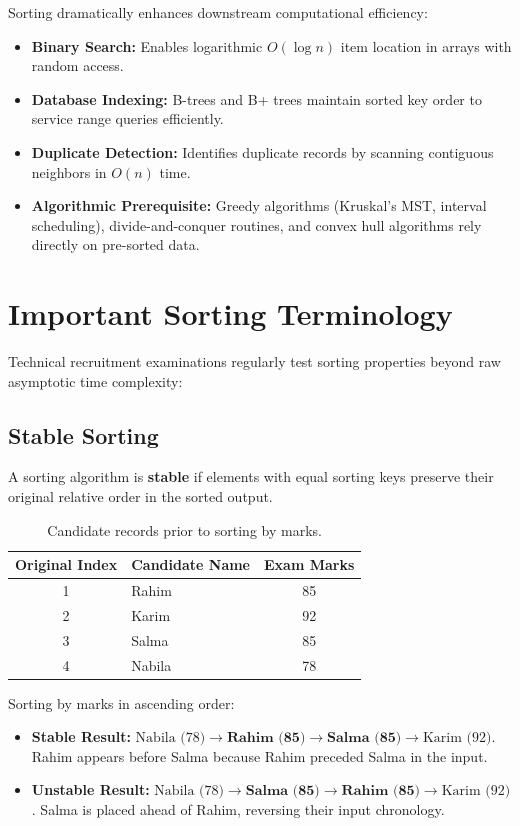 Sorting dramatically enhances downstream computational efficiency:
\begin{itemize}
    \item \textbf{Binary Search:} Enables logarithmic $O(\log n)$ item location in arrays with random access.
    \item \textbf{Database Indexing:} B-trees and B+ trees maintain sorted key order to service range queries efficiently.
    \item \textbf{Duplicate Detection:} Identifies duplicate records by scanning contiguous neighbors in $O(n)$ time.
    \item \textbf{Algorithmic Prerequisite:} Greedy algorithms (Kruskal's MST, interval scheduling), divide-and-conquer routines, and convex hull algorithms rely directly on pre-sorted data.
\end{itemize}

\section{Important Sorting Terminology}

Technical recruitment examinations regularly test sorting properties beyond raw asymptotic time complexity:

\subsection{Stable Sorting}

A sorting algorithm is \textbf{stable} if elements with equal sorting keys preserve their original relative order in the sorted output.

\begin{table}[htbp]
\centering
\small
\begin{tabular}{c l c}
\toprule
\textbf{Original Index} & \textbf{Candidate Name} & \textbf{Exam Marks} \\
\midrule
1 & Rahim  & 85 \\
2 & Karim  & 92 \\
3 & Salma  & 85 \\
4 & Nabila & 78 \\
\bottomrule
\end{tabular}
\caption{Candidate records prior to sorting by marks.}
\end{table}

Sorting by marks in ascending order:
\begin{itemize}
    \item \textbf{Stable Result:} $\text{Nabila (78)} \to \textbf{Rahim (85)} \to \textbf{Salma (85)} \to \text{Karim (92)}$. Rahim appears before Salma because Rahim preceded Salma in the input.
    \item \textbf{Unstable Result:} $\text{Nabila (78)} \to \textbf{Salma (85)} \to \textbf{Rahim (85)} \to \text{Karim (92)}$. Salma is placed ahead of Rahim, reversing their input chronology.
\end{itemize}

